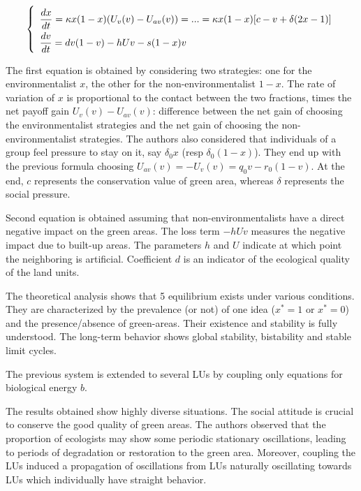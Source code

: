 \documentclass{article}
\begin{document}
\begin{equation}
\def\arraystretch{2}
\left\lbrace \begin{array}{l}
\dfrac{dx}{dt} = \kappa x (1 - x) (U_v(v) - U_{av}(v)) =...= \kappa x (1 - x) [c - v + \delta (2x-1)] \\
\dfrac{dv}{dt} = dv(1-v) -hUv - s(1-x) v
\end{array} \right.
\end{equation}

The first equation is obtained by considering two strategies: one for the environmentalist $x$, the other for the non-environmentalist $1-x$. The rate of variation of $x$ is proportional to the contact between the two fractions, times the net payoff gain $U_v(v) - U_{av}(v)$: difference between the net gain of choosing the environmentalist strategies and the net gain of choosing the non-environmentalist strategies. The authors also considered that individuals of a group feel pressure to stay on it, say $\delta_0 x$ (resp $\delta_0 (1-x)$). They end up with the previous formula choosing $U_{av}(v) = - U_v(v) = q_0 v - r_0(1-v)$. At the end, $c$ represents the conservation value of green area, whereas $\delta$ represents the social pressure.

Second equation is obtained assuming that non-environmentalists have a direct negative impact on the green areas. The loss term $-hUv$ measures the negative impact due to built-up areas. The parameters $h$ and  $U$ indicate at which point the neighboring is artificial. Coefficient $d$ is an indicator of the ecological quality of the land units.

The theoretical analysis shows that 5 equilibrium exists under various conditions. They are characterized by the prevalence (or not) of one idea ($x^* =1$ or $x^*=0$) and the presence/absence of green-areas. Their existence and stability is fully understood. The long-term behavior shows global stability, bistability and stable limit cycles.

The previous system is extended to several LUs by coupling only equations for biological energy $b$. 

The results obtained show highly diverse situations. The social attitude is crucial to conserve the good quality of green areas. The authors observed that the proportion of ecologists may show some periodic stationary oscillations, leading to periods of degradation or restoration to the green area. Moreover, coupling the LUs induced a propagation of oscillations from LUs naturally oscillating towards LUs which individually have straight behavior.
\end{document}
